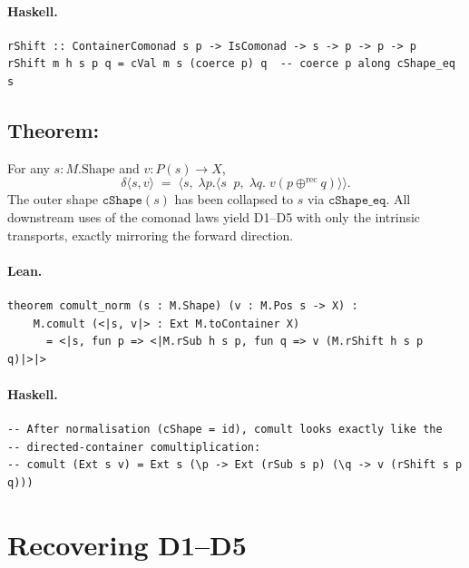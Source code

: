 \documentclass[11pt,a4paper]{article}
\begin{document}
\paragraph{Haskell.}
\begin{lstlisting}[style=haskell]
rShift :: ContainerComonad s p -> IsComonad -> s -> p -> p -> p
rShift m h s p q = cVal m s (coerce p) q  -- coerce p along cShape_eq s
\end{lstlisting}


\subsection{Theorem: }

\begin{thm}
For any $s : M.\mathrm{Shape}$ and $v : P(s) \to X$,
\[
  \delta\langle s, v \rangle
  \;=\;
  \bigl\langle s,\;
    \lambda p.\langle s \mathop{\downarrow^\mathrm{rec}} p,\;
      \lambda q.\; v(p \oplus^\mathrm{rec} q)\rangle
  \bigr\rangle.
\]
The outer shape $\mathtt{cShape}(s)$ has been collapsed to $s$ via
$\mathtt{cShape\_eq}$.  All downstream uses of the comonad laws yield D1--D5
with only the intrinsic transports, exactly mirroring the forward direction.
\end{thm}

\paragraph{Lean.}
\begin{lstlisting}[style=lean]
theorem comult_norm (s : M.Shape) (v : M.Pos s -> X) :
    M.comult (<|s, v|> : Ext M.toContainer X)
      = <|s, fun p => <|M.rSub h s p, fun q => v (M.rShift h s p q)|>|>
\end{lstlisting}

\paragraph{Haskell.}
\begin{lstlisting}[style=haskell]
-- After normalisation (cShape = id), comult looks exactly like the
-- directed-container comultiplication:
-- comult (Ext s v) = Ext s (\p -> Ext (rSub s p) (\q -> v (rShift s p q)))
\end{lstlisting}


\section{Recovering D1--D5}
\end{document}
